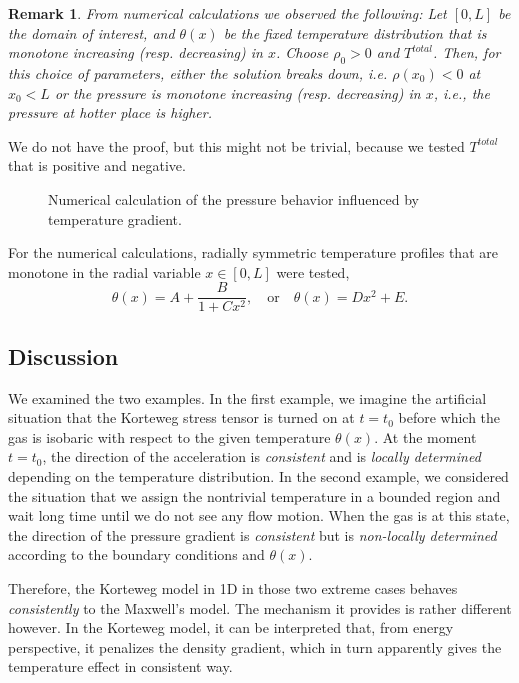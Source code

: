 \documentclass[a4paper,12pt]{article}
\newtheorem{remark}{Remark}[section]
\begin{document}
\begin{remark}
From numerical calculations we observed the following: Let $[0,L]$ be the domain of interest, and $\theta(x)$ be the fixed temperature distribution that is monotone increasing (resp. decreasing) in $x$. Choose $\rho_0>0$ and $T^{total}$. Then, for this choice of parameters, either the solution breaks down, i.e. $\rho(x_0)<0$ at $x_0<L$ or the pressure is monotone increasing (resp. decreasing) in $x$, i.e., the pressure at hotter place is higher.
\end{remark}
We do not have the proof, but this might not be trivial, because we tested $T^{total}$ that is positive and negative.
\begin{figure}
 	\centering
     \hfill
	\caption{Numerical calculation of the pressure behavior influenced by temperature gradient.}
\end{figure}

For the numerical calculations, radially symmetric temperature profiles that are monotone in the radial variable $x \in [0,L]$ were tested, 
$$ \theta(x) = A+ \frac{B}{1+Cx^2}, \quad \text{or} \quad \theta(x) = Dx^2 + E. $$

\subsection{Discussion}
We examined the two examples. In the first example, we imagine the artificial situation that the Korteweg stress tensor is turned on at $t=t_0$ before which the gas is isobaric with respect to the given temperature $\theta(x)$. At the moment $t=t_0$, the direction of the acceleration is {\it consistent} and is {\it locally determined} depending on the temperature distribution. In the second example, we considered the situation that we assign the nontrivial temperature in a bounded region and wait long time until we do not see any flow motion. When the gas is at this state, the direction of the pressure gradient is {\it consistent} but is {\it non-locally determined} according to the boundary conditions and $\theta(x)$.

Therefore, the Korteweg model in 1D in those two extreme cases behaves {\it consistently} to the Maxwell's model. The mechanism it provides is rather different however. In the Korteweg model, it can be interpreted that, from energy perspective, it penalizes the density gradient, which in turn apparently gives the temperature effect in consistent way. 
\end{document}

